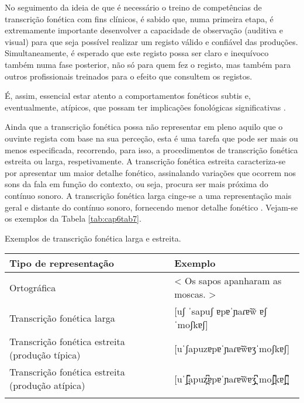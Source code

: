 \documentclass[output=paper,colorlinks,citecolor=brown,booklanguage=portuguese]{langscibook}
\begin{document}
No seguimento da ideia de que é necessário o treino de competências de transcrição fonética com fins clínicos, é sabido que, numa primeira etapa, é extremamente importante desenvolver a capacidade de observação (auditiva e visual) para que seja possível realizar um registo válido e confiável das produções. Simultaneamente, é esperado que este registo possa ser claro e inequívoco também numa fase posterior, não só para quem fez o registo, mas também para outros profissionais treinados para o efeito que consultem os registos.

É, assim, essencial estar atento a comportamentos fonéticos subtis e, eventualmente, atípicos, que possam ter implicações fonológicas significativas \citep{Howard2002}.

Ainda que a transcrição fonética possa não representar em pleno aquilo que o ouvinte regista com base na sua perceção, esta é uma tarefa que pode ser mais ou menos especificada, recorrendo, para isso, a procedimentos de transcrição fonética estreita ou larga, respetivamente. A transcrição fonética estreita caracteri\-za-se por apresentar um maior detalhe fonético, assinalando variações que ocorrem nos sons da fala em função do contexto, ou seja, procura ser mais próxima do contínuo sonoro. A transcrição fonética larga cinge-se a uma representação mais geral e distante do contínuo sonoro, fornecendo menor detalhe fonético \citep{Mateus2016}. Vejam-se os exemplos da Tabela \ref{tab:cap6tab7}.



\begin{Tabela}
\caption{Exemplos de transcrição fonética larga e estreita. }
\label{tab:cap6tab7}


\begin{tabularx}{\textwidth}{Ql}
\lsptoprule
     \textbf{Tipo de representação} & \textbf{Exemplo}\\
     \midrule
     Ortográfica &	< Os sapos apanharam as moscas. >\\
     \tablevspace
     Transcrição fonética larga &	[uʃ ˈsapuʃ ɐpɐˈɲaɾɐ̃w̃ ɐʃ ˈmoʃkɐʃ]\\
     \tablevspace
     Transcrição fonética estreita (produção típica) &	[uˈʃapuzɐpɐˈɲaɾɐ̃w̃ɐʒˈmoʃkɐʃ]\\
     \tablevspace
   Transcrição fonética estreita (produção atípica) &	[uˈʃ̪͆apuz̪͆ɐpɐˈɲaɾɐ̃w̃ɐʒ̪͆ˈmoʃ̪͆kɐʃ̪͆]
  \\
  \lspbottomrule
\end{tabularx}
\end{Tabela}
\end{document}
